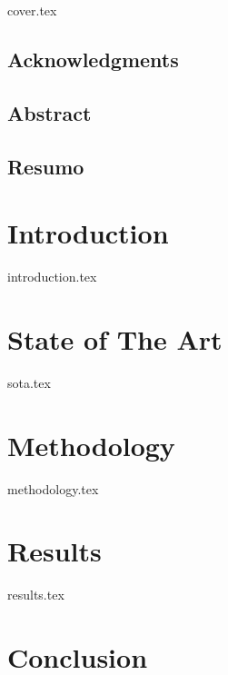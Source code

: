 \documentclass[a4paper, 12pt]{report}
\begin{document}
{cover.tex}
\listoffigures
\newpage
\listoftables
\newpage
\tableofcontents
\frontmatter
\section*{Acknowledgments}

\newpage
\section*{Abstract}

\newpage
\section*{Resumo}

\mainmatter


\newpage
\chapter{Introduction}
{introduction.tex}

\newpage
\chapter{State of The Art}
{sota.tex}

\newpage
\chapter{Methodology}
{methodology.tex}
\newpage
\chapter{Results}
{results.tex}

\newpage
\chapter{Conclusion}

\newpage
\printbibliography
\end{document}
